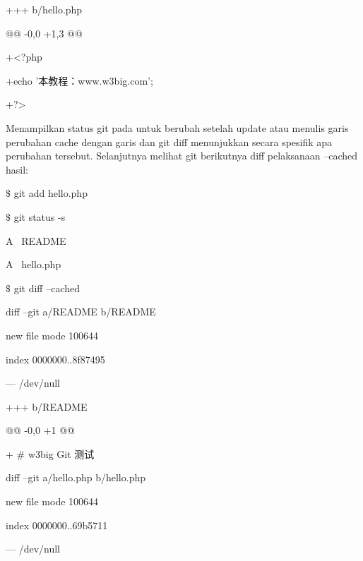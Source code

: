 \noindent 
{\fontsize{10pt}{10pt}\selectfont +++ b/hello.php} \par
\noindent 
{\fontsize{10pt}{10pt}\selectfont @@ -0,0 +1,3 @@} \par
\noindent 
{\fontsize{10pt}{10pt}\selectfont +<?php} \par
\noindent 
{\fontsize{10pt}{10pt}\selectfont +echo '本教程：www.w3big.com';} \par
\noindent 
{\fontsize{10pt}{10pt}\selectfont +?>} \par
\noindent 
\vspace{10pt}
Menampilkan status git pada untuk berubah setelah update atau menulis garis perubahan cache dengan garis dan git diff menunjukkan secara spesifik apa perubahan tersebut.  Selanjutnya melihat git berikutnya diff pelaksanaan --cached hasil:  \par
\noindent 
{\fontsize{10pt}{10pt}\selectfont  $  \$  $ git add hello.php } \par
\noindent 
{\fontsize{10pt}{10pt}\selectfont  $  \$  $ git status -s} \par
\noindent 
{\fontsize{10pt}{10pt}\selectfont A~ README} \par
\noindent 
{\fontsize{10pt}{10pt}\selectfont A~ hello.php} \par
\noindent 
{\fontsize{10pt}{10pt}\selectfont  $  \$  $ git diff --cached} \par
\noindent 
{\fontsize{10pt}{10pt}\selectfont diff --git a/README b/README} \par
\noindent 
{\fontsize{10pt}{10pt}\selectfont new file mode 100644} \par
\noindent 
{\fontsize{10pt}{10pt}\selectfont index 0000000..8f87495} \par
\noindent 
{\fontsize{10pt}{10pt}\selectfont --- /dev/null} \par
\noindent 
{\fontsize{10pt}{10pt}\selectfont +++ b/README} \par
\noindent 
{\fontsize{10pt}{10pt}\selectfont @@ -0,0 +1 @@} \par
\noindent 
{\fontsize{10pt}{10pt}\selectfont + $  \#  $ w3big Git 测试} \par
\noindent 
{\fontsize{10pt}{10pt}\selectfont diff --git a/hello.php b/hello.php} \par
\noindent 
{\fontsize{10pt}{10pt}\selectfont new file mode 100644} \par
\noindent 
{\fontsize{10pt}{10pt}\selectfont index 0000000..69b5711} \par
\noindent 
{\fontsize{10pt}{10pt}\selectfont --- /dev/null} \par
